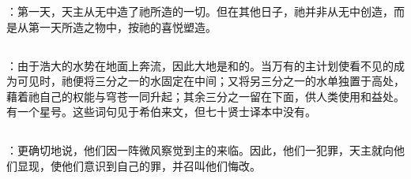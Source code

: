\par

：第一天，天主从无中造了祂所造的一切。但在其他日子，祂并非从无中创造，而是从第一天所造之物中，按祂的喜悦塑造。\par


\subsection{}

\par

：由于浩大的水势在地面上奔流，因此大地是和的。当万有的主计划使看不见的成为可见时，祂便将三分之一的水固定在中间；又将另三分之一的水单独置于高处，藉着祂自己的权能与穹苍一同升起；其余三分之一留在下面，供人类使用和益处。有一个星号。这些词句见于希伯来文，但七十贤士译本中没有。\par


\subsection{}

\par

：更确切地说，他们因一阵微风察觉到主的来临。因此，他们一犯罪，天主就向他们显现，使他们意识到自己的罪，并召叫他们悔改。\par


\subsection{}

\par

